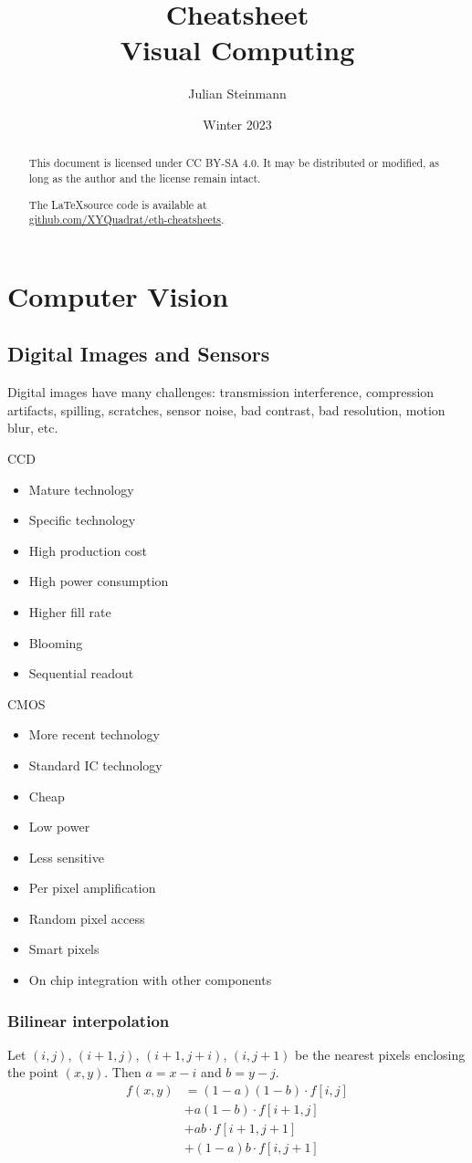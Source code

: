 \documentclass[a4paper,10pt]{article}
\title{Cheatsheet\\ Visual Computing}
\author{Julian Steinmann}
\date{\vspace{-10pt}Winter 2023}
\newcommand*\good{\item[\textcolor{goodgreen}{\(\bm{+}\)}]}
\newcommand*\bad{\item[\textcolor{badred}{\(\bm{-}\)}]}
\begin{document}
\maketitle

\renewcommand{\abstractname}{License}
\begin{abstract}
	This document is licensed under CC BY-SA 4.0. It may be distributed or modified, as long as the author and the license remain intact.

	\begin{center}
	    The \LaTeX source code is available at \\ \href{https://github.com/XYQuadrat/eth-cheatsheets}{\color{brandblue}github.com/XYQuadrat/eth-cheatsheets}.
	\end{center}
\end{abstract}

\section{Computer Vision}
\subsection{Digital Images and Sensors}
Digital images have many challenges: transmission interference, compression artifacts, spilling, scratches, sensor noise, bad contrast, bad resolution, motion blur, etc.
\begin{subbox}{CCD}
    \begin{itemize}
        \good Mature technology
        \bad Specific technology
        \bad High production cost
        \bad High power consumption
        \good Higher fill rate
        \bad Blooming
        \bad Sequential readout
    \end{itemize}
\end{subbox}{}
\begin{subbox}{CMOS}
    \begin{itemize}
        \item More recent technology
        \good Standard IC technology
        \good Cheap
        \good Low power
        \bad Less sensitive
        \good Per pixel amplification
        \good Random pixel access
        \good Smart pixels
        \good On chip integration with other components
    \end{itemize}
\end{subbox}

\subsubsection{Bilinear interpolation}
Let \((i, j)\), \((i + 1, j)\), \((i + 1, j + i)\), \((i, j + 1)\) be the nearest pixels enclosing the point \((x, y)\). Then \(a = x - i\) and \(b = y - j\).
\begin{align*}
    f(x, y) &= (1 - a)(1 - b) \cdot f[i, j]\\
    &+ a(1 - b) \cdot f[i + 1, j]\\
    &+ ab \cdot f[i + 1, j + 1]\\
    &+ (1 - a)b \cdot f[i, j + 1]
\end{align*}
\end{document}
